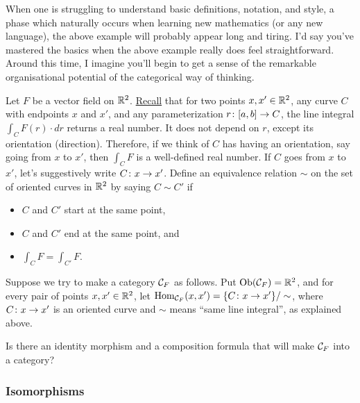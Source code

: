 \begin{remark}

When one is struggling to understand basic definitions, notation, and style, a phase which naturally occurs when learning new mathematics (or any new language), the above example will probably appear long and tiring. I'd say you've mastered the basics when the above example really does feel straightforward. Around this time, I imagine you'll begin to get a sense of the remarkable organisational potential of the categorical way of thinking.

\end{remark} 

\begin{exercise}\label{exc:vector field 1}
Let $F$ be a vector field on ${\mathbb R}^2$. \href{http://en.wikipedia.org/wiki/Line_integral#Line_integral_of_a_vector_field}{Recall} that for two points $x,x'\in{\mathbb R}^2$, any curve $C$ with endpoints $x$ and $x'$, and any parameterization $r\colon [a,b]\rightarrow C$, the line integral $\int_CF(r)\cdot dr$ returns a real number. It does not depend on $r$, except its orientation (direction). Therefore, if we think of $C$ has having an orientation, say going from $x$ to $x'$, then $\int_CF$ is a well-defined real number. If $C$ goes from $x$ to $x'$, let's suggestively write $C\colon x\rightarrow x'$. Define an equivalence relation $\sim$ on the set of oriented curves in ${\mathbb R}^2$ by saying $C\sim C'$ if
\begin{itemize}
\item $C$ and $C'$ start at the same point,
\item $C$ and $C'$ end at the same point, and
\item $\int_CF=\int_{C'}F$.
\end{itemize}

Suppose we try to make a category $\mathcal{C}_F$ as follows. Put $\textnormal{Ob}(\mathcal{C}_F)={\mathbb R}^2$, and for every pair of points $x,x'\in{\mathbb R}^2$, let $\textnormal{Hom}_{\mathcal{C}_F}(x,x')=\{C\colon x\rightarrow x'\}/\sim$, where $C\colon x\rightarrow x'$ is an oriented curve and $\sim$ means “same line integral”, as explained above. 

Is there an identity morphism and a composition formula that will make $\mathcal{C}_F$ into a category? 
\end{exercise}


\subsubsection{Isomorphisms}

